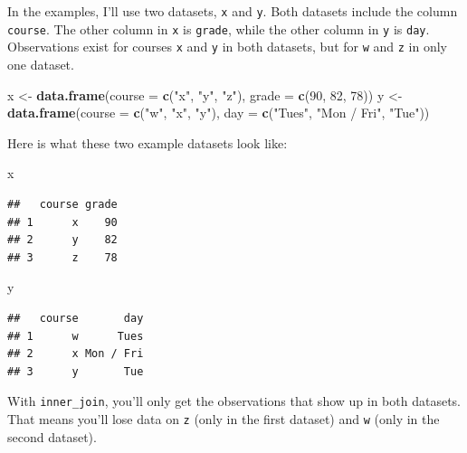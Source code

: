 \documentclass[]{book}
\makeatletter
\newenvironment{Shaded}{\begin{snugshade}}{\end{snugshade}}
\newcommand{\KeywordTok}[1]{\textcolor[rgb]{0.13,0.29,0.53}{\textbf{{#1}}}}
\newcommand{\DataTypeTok}[1]{\textcolor[rgb]{0.13,0.29,0.53}{{#1}}}
\newcommand{\DecValTok}[1]{\textcolor[rgb]{0.00,0.00,0.81}{{#1}}}
\newcommand{\StringTok}[1]{\textcolor[rgb]{0.31,0.60,0.02}{{#1}}}
\newcommand{\NormalTok}[1]{{#1}}
\newenvironment{kframe}{%
\medskip{}
\setlength{\fboxsep}{.8em}
 \def\at@end@of@kframe{}%
 \ifinner\ifhmode%
  \def\at@end@of@kframe{\end{minipage}}%
  \begin{minipage}{\columnwidth}%
 \fi\fi%
 \def\FrameCommand##1{\hskip\@totalleftmargin \hskip-\fboxsep
 \colorbox{shadecolor}{##1}\hskip-\fboxsep
     \hskip-\linewidth \hskip-\@totalleftmargin \hskip\columnwidth}%
 \MakeFramed {\advance\hsize-\width
   \@totalleftmargin\z@ \linewidth\hsize
   \@setminipage}}%
 {\par\unskip\endMakeFramed%
 \at@end@of@kframe}
\renewenvironment{Shaded}{\begin{kframe}}{\end{kframe}}
\makeatother
\begin{document}
In the examples, I'll use two datasets, \texttt{x} and \texttt{y}. Both
datasets include the column \texttt{course}. The other column in
\texttt{x} is \texttt{grade}, while the other column in \texttt{y} is
\texttt{day}. Observations exist for courses \texttt{x} and \texttt{y}
in both datasets, but for \texttt{w} and \texttt{z} in only one dataset.

\begin{Shaded}
\begin{Highlighting}[]
\NormalTok{x <-}\StringTok{ }\KeywordTok{data.frame}\NormalTok{(}\DataTypeTok{course =} \KeywordTok{c}\NormalTok{(}\StringTok{"x"}\NormalTok{, }\StringTok{"y"}\NormalTok{, }\StringTok{"z"}\NormalTok{),}
                \DataTypeTok{grade =} \KeywordTok{c}\NormalTok{(}\DecValTok{90}\NormalTok{, }\DecValTok{82}\NormalTok{, }\DecValTok{78}\NormalTok{))}
\NormalTok{y <-}\StringTok{ }\KeywordTok{data.frame}\NormalTok{(}\DataTypeTok{course =} \KeywordTok{c}\NormalTok{(}\StringTok{"w"}\NormalTok{, }\StringTok{"x"}\NormalTok{, }\StringTok{"y"}\NormalTok{),}
                \DataTypeTok{day =} \KeywordTok{c}\NormalTok{(}\StringTok{"Tues"}\NormalTok{, }\StringTok{"Mon / Fri"}\NormalTok{, }\StringTok{"Tue"}\NormalTok{))}
\end{Highlighting}
\end{Shaded}

Here is what these two example datasets look like:

\begin{Shaded}
\begin{Highlighting}[]
\NormalTok{x}
\end{Highlighting}
\end{Shaded}

\begin{verbatim}
##   course grade
## 1      x    90
## 2      y    82
## 3      z    78
\end{verbatim}

\begin{Shaded}
\begin{Highlighting}[]
\NormalTok{y}
\end{Highlighting}
\end{Shaded}

\begin{verbatim}
##   course       day
## 1      w      Tues
## 2      x Mon / Fri
## 3      y       Tue
\end{verbatim}

With \texttt{inner\_join}, you'll only get the observations that show up
in both datasets. That means you'll lose data on \texttt{z} (only in the
first dataset) and \texttt{w} (only in the second dataset).
\end{document}

